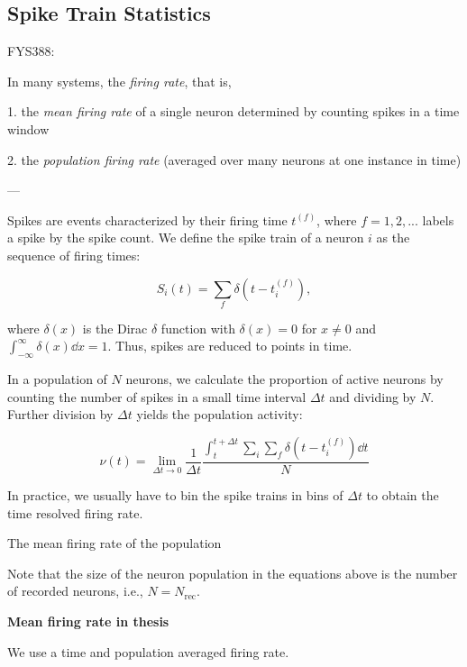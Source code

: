 \subsection{Spike Train Statistics}

FYS388: 

In many systems, the \textit{firing rate}, that is, 

1. the \textit{mean firing rate} of a single neuron determined by counting spikes in a time window 

2. the \textit{population firing rate} (averaged over many neurons at one instance in time) 

---

Spikes are events characterized by their firing time $t^{(f)}$, where $f=1, 2, ...$ labels a spike by the spike count. We define the spike train of a neuron $i$ as the sequence of firing times: 

\begin{equation}
    S_i(t) = \sum_f \delta \left(t - t_i^{(f)} \right),
\end{equation}

where $\delta(x)$ is the Dirac $\delta$ function with $\delta(x)=0$ for $x \neq 0$ and $\int_{-\infty}^\infty \delta (x) \dd{x} = 1$. Thus, spikes are reduced to points in time. 

In a population of $N$ neurons, we calculate the proportion of active neurons by counting the number of spikes in a small time interval $\Delta t$ and dividing by $N$. Further division by $\Delta t$ yields the population activity:

\begin{equation}
    \nu (t) = \lim_{\Delta t \to 0} \frac{1}{\Delta t} \frac{\int_{t}^{t + \Delta t} \sum_i \sum_f \delta \left(t - t_i^{(f)} \right) \dd{t}}{N}
\end{equation} 

In practice, we usually have to bin the spike trains in bins of $\Delta t$ to obtain the time resolved firing rate. 

The mean firing rate of the population  


Note that the size of the neuron population in the equations above is the number of recorded neurons, i.e., $N = N_\mathrm{rec}$.

\textbf{Mean firing rate in thesis}

We use a time and population averaged firing rate. 

